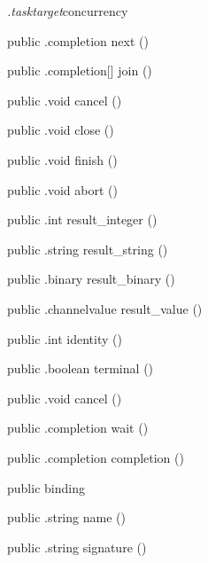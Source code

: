 \begin{CrexxClass}{\textit{.tasktarget}}{concurrency}
\begin{Members}
    \Method
      {public}
      {.completion}
      {next}
      {()}

    \Method
      {public}
      {.completion[]}
      {join}
      {()}

    \Method
      {public}
      {.void}
      {cancel}
      {()}

    \Method
      {public}
      {.void}
      {close}
      {()}

    \Method
      {public}
      {.void}
      {finish}
      {()}

    \Method
      {public}
      {.void}
      {abort}
      {()}

    \Method
      {public}
      {.int}
      {result\_integer}
      {()}

    \Method
      {public}
      {.string}
      {result\_string}
      {()}

    \Method
      {public}
      {.binary}
      {result\_binary}
      {()}

    \Method
      {public}
      {.channelvalue}
      {result\_value}
      {()}

    \Method
      {public}
      {.int}
      {identity}
      {()}

    \Method
      {public}
      {.boolean}
      {terminal}
      {()}

    \Method
      {public}
      {.void}
      {cancel}
      {()}

    \Method
      {public}
      {.completion}
      {wait}
      {()}

    \Method
      {public}
      {.completion}
      {completion}
      {()}

    \Factory
      {public}
      {binding}
      {}

    \Method
      {public}
      {.string}
      {name}
      {()}

    \Method
      {public}
      {.string}
      {signature}
      {()}

  \end{Members}
\end{CrexxClass}

